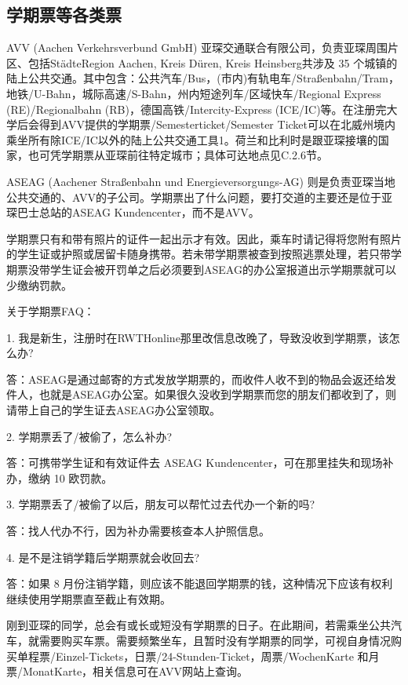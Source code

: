   \subsection{学期票等各类票}

    AVV (Aachen Verkehrsverbund GmbH) 亚琛交通联合有限公司，负责亚琛周围片区、包括StädteRegion Aachen, Kreis Düren, Kreis Heinsberg共涉及 35 个城镇的陆上公共交通。其中包含：公共汽车/Bus，(市内)有轨电车/Straßenbahn/Tram，地铁/U-Bahn，城际高速/S-Bahn，州内短途列车/区域快车/Regional Express (RE)/Regionalbahn (RB)，德国高铁/Intercity-Express (ICE/IC)等。在注册完大学后会得到AVV提供的学期票/Semesterticket/Semester Ticket可以在北威州境内乘坐所有除ICE/IC以外的陆上公共交通工具1。荷兰和比利时是跟亚琛接壤的国家，也可凭学期票从亚琛前往特定城市；具体可达地点见C.2.6节。

    ASEAG (Aachener Straßenbahn und Energieversorgungs-AG) 则是负责亚琛当地公共交通的、AVV的子公司。学期票出了什么问题，要打交道的主要还是位于亚琛巴士总站的ASEAG Kundencenter，而不是AVV。

    学期票只有和带有照片的证件一起出示才有效。因此，乘车时请记得将您附有照片的学生证或护照或居留卡随身携带。若未带学期票被查到按照逃票处理，若只带学期票没带学生证会被开罚单之后必须要到ASEAG的办公室报道出示学期票就可以少缴纳罚款。

    关于学期票FAQ：

    1. 我是新生，注册时在RWTHonline那里改信息改晚了，导致没收到学期票，该怎么办?

    答：ASEAG是通过邮寄的方式发放学期票的，而收件人收不到的物品会返还给发件人，也就是ASEAG办公室。如果很久没收到学期票而您的朋友们都收到了，则请带上自己的学生证去ASEAG办公室领取。

    2. 学期票丢了/被偷了，怎么补办?

    答：可携带学生证和有效证件去 ASEAG Kundencenter，可在那里挂失和现场补办，缴纳 10 欧罚款。

    3. 学期票丢了/被偷了以后，朋友可以帮忙过去代办一个新的吗?

    答：找人代办不行，因为补办需要核查本人护照信息。

    4. 是不是注销学籍后学期票就会收回去?

    答：如果 8 月份注销学籍，则应该不能退回学期票的钱，这种情况下应该有权利继续使用学期票直至截止有效期。

    刚到亚琛的同学，总会有或长或短没有学期票的日子。在此期间，若需乘坐公共汽车，就需要购买车票。需要频繁坐车，且暂时没有学期票的同学，可视自身情况购买单程票/Einzel-Tickets，日票/24-Stunden-Ticket，周票/WochenKarte 和月票/MonatKarte，相关信息可在AVV网站上查询。

